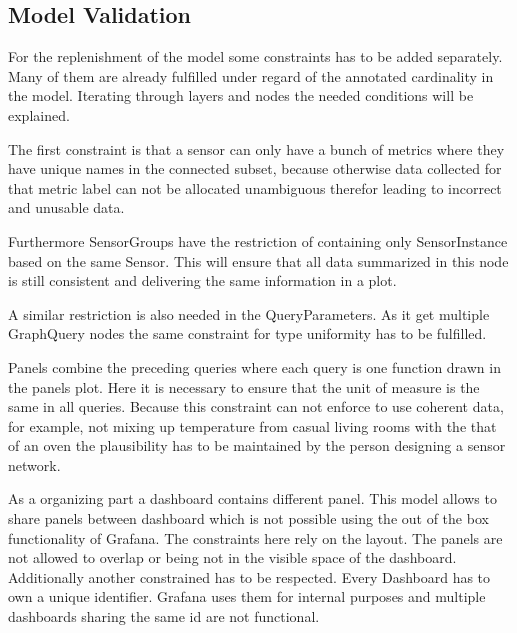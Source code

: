 \subsection{Model Validation}
For the replenishment of the model some constraints has to be added separately. Many of them are already fulfilled under regard of the annotated cardinality in the model. Iterating through layers and nodes the needed conditions will be explained. 

The first constraint is that a sensor can only have a bunch of metrics where they have unique names in the connected subset, because otherwise data collected for that metric label can not be allocated unambiguous therefor leading to incorrect and unusable data. 

Furthermore SensorGroups have the restriction of containing only SensorInstance based on the same Sensor. This will ensure that all data summarized in this node is still consistent and delivering the same information in a plot.

A similar restriction is also needed in the QueryParameters. As it get multiple GraphQuery nodes the same constraint for type uniformity has to be fulfilled.

Panels combine the preceding queries where each query is one function drawn in the panels plot. Here it is necessary to ensure that the unit of measure is the same in all queries. Because this constraint can not enforce to use coherent data, for example, not mixing up temperature from casual living rooms with the that of an oven the plausibility has to be maintained by the person designing a sensor network.

As a organizing part a dashboard contains different panel. This model allows to share panels between dashboard which is not possible using the out of the box functionality of Grafana. The constraints here rely on the layout. The panels are not allowed to overlap or being not in the visible space of the dashboard. Additionally another constrained has to be respected. Every Dashboard has to own a unique identifier. Grafana uses them for internal purposes and multiple dashboards sharing the same id are not functional.



